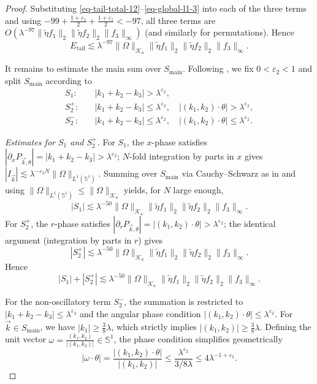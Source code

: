 \documentclass[11pt]{amsart}
\begin{document}
\begin{proof}
	Substituting \eqref{eq-tail-total-12}--\eqref{eq-global-l1-3} into each of 
	the three terms and using $-99 + \frac{1+\varepsilon_1}{2} + \frac{1+\varepsilon_1}{2} 
	< -97$, all three terms are $O(\lambda^{-97}\|\widetilde\eta f_1\|_2
	\|\widetilde\eta f_2\|_2\|f_3\|_\infty)$ (and similarly for permutations). 
	Hence
	\begin{equation}\label{eqA-terms}
		E_{\text{tail}} \lesssim \lambda^{-97} \|\Omega\|_{\mathcal K_a} \|\widetilde\eta f_1\|_2\|\widetilde\eta f_2\|_2\|f_3\|_\infty.
	\end{equation}
	
	It remains to estimate the main sum over $S_{\text{main}}$. Following 
	\cite[Section~4.4]{bhojak2025alternate}, we fix $0<\varepsilon_2<1$ and 
	split $S_{\text{main}}$ according to
	\begin{align*}
		S_1 :& \quad |k_1+k_2-k_3| > \lambda^{\varepsilon_2}, \\
		S_2^+ :& \quad |k_1+k_2-k_3| \le \lambda^{\varepsilon_2},\quad 
		|(k_1,k_2)\cdot\theta| > \lambda^{\varepsilon_2}, \\
		S_2^- :& \quad |k_1+k_2-k_3| \le \lambda^{\varepsilon_2},\quad 
		|(k_1,k_2)\cdot\theta| \le \lambda^{\varepsilon_2}.
	\end{align*}
	
	\textit{Estimates for $S_1$ and $S_2^+$.}
	For $S_1$, the $x$-phase satisfies $|\partial_x P_{\vec k,\theta}|=
	|k_1+k_2-k_3|>\lambda^{\varepsilon_2}$; $N$-fold integration by parts 
	in $x$ gives $|I_{\vec k}|\lesssim\lambda^{-\varepsilon_2N}\|\Omega\|_{L^1(\mathbb S^1)}$.
	Summing over $S_{\text{main}}$ via Cauchy--Schwarz as in 
	\cite[Section~4.4]{bhojak2025alternate} and using 
	$\|\Omega\|_{L^1(\mathbb S^1)}\le\|\Omega\|_{\mathcal K_a}$ yields,
	for $N$ large enough,
	\[
	|S_1| \lesssim \lambda^{-50}\|\Omega\|_{\mathcal K_a}
	\|\widetilde\eta f_1\|_2\|\widetilde\eta f_2\|_2\|f_3\|_\infty.
	\]
	For $S_2^+$, the $r$-phase satisfies $|\partial_r P_{\vec k,\theta}|=
	|(k_1,k_2)\cdot\theta|>\lambda^{\varepsilon_2}$; the identical argument 
	(integration by parts in $r$) gives
	\[
	|S_2^+| \lesssim \lambda^{-50}\|\Omega\|_{\mathcal K_a}
	\|\widetilde\eta f_1\|_2\|\widetilde\eta f_2\|_2\|f_3\|_\infty.
	\]
	Hence
	\begin{equation}\label{eqS1S2plus}
		|S_1|+|S_2^+|\lesssim\lambda^{-50}\|\Omega\|_{\mathcal K_a}
		\|\widetilde\eta f_1\|_2\|\widetilde\eta f_2\|_2\|f_3\|_\infty.
	\end{equation}
	
	For the non-oscillatory term $S_2^-$, the summation is restricted to $|k_1+k_2-k_3| \le \lambda^{\varepsilon_2}$ and the angular phase condition $|(k_1,k_2)\cdot \theta| \le \lambda^{\varepsilon_2}$. For $\vec{k} \in S_{\text{main}}$, we have $|k_1| \ge \frac{3}{8}\lambda$, which strictly implies $|(k_1,k_2)| \ge \frac{3}{8}\lambda$. Defining the unit vector $\omega = \frac{(k_1,k_2)}{|(k_1,k_2)|} \in \mathbb{S}^1$, the phase condition simplifies geometrically
	\[
	|\omega \cdot \theta| = \frac{|(k_1,k_2)\cdot \theta|}{|(k_1,k_2)|} \le \frac{\lambda^{\varepsilon_2}}{3/8 \lambda} \le 4\lambda^{-1+\varepsilon_2}.
	\]
	

\end{proof}
\end{document}
